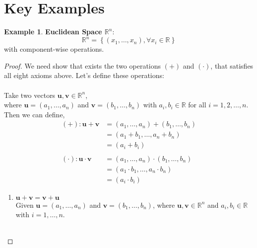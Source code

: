 \documentclass{article}
\theoremstyle{plain}
\theoremstyle{definition}
\newtheorem{example}{Example}[section]
\theoremstyle{remark}
\newcommand{\thmheader}[1]{%
  \textcolor{#1}{\normalfont\bfseries}%
}
\begin{document}
\section{Key Examples}
\begin{example}
\thmheader{excolor}\textbf{Euclidean Space $\mathbb{R}^n$}:
\[
\mathbb{R}^n = \left\{ (x_1, \hdots, x_n), \forall x_i \in \mathbb{R} \right\}
\]
with component-wise operations.
    \begin{proof}
        We need show that exists the two operations $(+)$ and $(\cdot)$, that satisfies all eight axioms above. Let's define these operations: \\
        \\
        Take two vectors $\mathbf{u}, \mathbf{v} \in \mathbb{R}^n$, \\
        where $\mathbf{u} = (a_1, \ldots, a_n)$ and $\mathbf{v} = (b_1, \ldots, b_n)$ with $a_i, b_i \in \mathbb{R}$ for all $i = 1, 2, \ldots, n$. \\
        Then we can define,\\
                \[
                \begin{aligned}
                    (+): \mathbf{u} + \mathbf{v} &= (a_1, \ldots, a_n) + (b_1, \ldots, b_n) \\
                                               &= (a_1 + b_1, \ldots, a_n + b_n) \\
                                               &= (a_i + b_i) \\
                                               \\
                    (\cdot): \mathbf{u} \cdot \mathbf{v} &= (a_1, \ldots, a_n) \cdot (b_1, \ldots, b_n) \\
                                                       &= (a_1 \cdot b_1, \ldots, a_n \cdot b_n) \\
                                                       &= (a_i \cdot b_i)
                \end{aligned}
                \]
        \begin{enumerate}[label=(V\arabic*),leftmargin=*]
            \item $\mathbf{u} + \mathbf{v} = \mathbf{v} + \mathbf{u}$ \\
                Given $\mathbf{u} = (a_1, \ldots, a_n)$ and $\mathbf{v} = (b_1, \ldots, b_n)$, where $\mathbf{u}, \mathbf{v} \in \mathbb{R}^n$ and $a_i, b_i \in \mathbb{R}$ with $i = 1, \ldots, n$. \\
                \\

\end{enumerate}
\end{proof}
\end{example}
\end{document}

